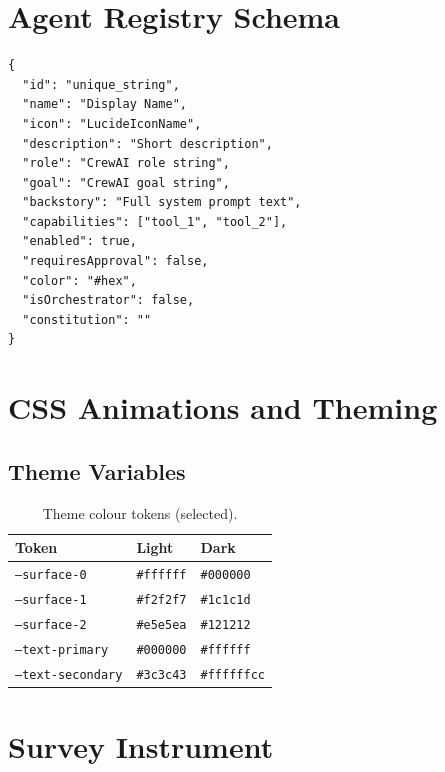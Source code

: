 \documentclass[sigconf, anonymous]{acmart}
\begin{document}
\section{Agent Registry Schema}
\label{app:registry}

{\small
\begin{verbatim}
{
  "id": "unique_string",
  "name": "Display Name",
  "icon": "LucideIconName",
  "description": "Short description",
  "role": "CrewAI role string",
  "goal": "CrewAI goal string",
  "backstory": "Full system prompt text",
  "capabilities": ["tool_1", "tool_2"],
  "enabled": true,
  "requiresApproval": false,
  "color": "#hex",
  "isOrchestrator": false,
  "constitution": ""
}
\end{verbatim}
}


\section{CSS Animations and Theming}
\label{app:css}

\subsection{Theme Variables}

\begin{table}[h]
  \caption{Theme colour tokens (selected).}
  \label{tab:theme}
  \small
  \begin{tabular}{p{} p{} p{}}
    \toprule
    Token & Light & Dark \\
    \midrule
    \texttt{--surface-0} & \texttt{\#ffffff} & \texttt{\#000000} \\
    \texttt{--surface-1} & \texttt{\#f2f2f7} & \texttt{\#1c1c1d} \\
    \texttt{--surface-2} & \texttt{\#e5e5ea} & \texttt{\#121212} \\
    \texttt{--text-primary} & \texttt{\#000000} & \texttt{\#ffffff} \\
    \texttt{--text-secondary} & \texttt{\#3c3c43} & \texttt{\#ffffffcc} \\
    \bottomrule
  \end{tabular}
\end{table}


\section{Survey Instrument}
\label{app:survey}
\end{document}

